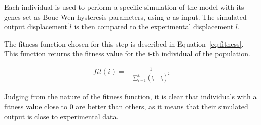 Each individual is used to perform a specific simulation of the model with its genes
set as Bouc-Wen hysteresis parameters, using $u$ as input.
The simulated output displacement $\hat{l}$
is then compared to the experimental displacement $l$.

The fitness function chosen for this step is described in Equation~\ref{eq:fitness}.
This function returns the fitness value for the i-th individual of the population.

\begin{align}
fit(i) = -\frac{1}{\sum_{i=1}^k{\left(l_i-\hat{l}_i\right)^2}}
\label{eq:fitness}
\end{align}

Judging from the nature of the fitness function, it is clear that
individuals with a fitness value close to 0 are better than others,
as it means that their simulated output is close to experimental data.



